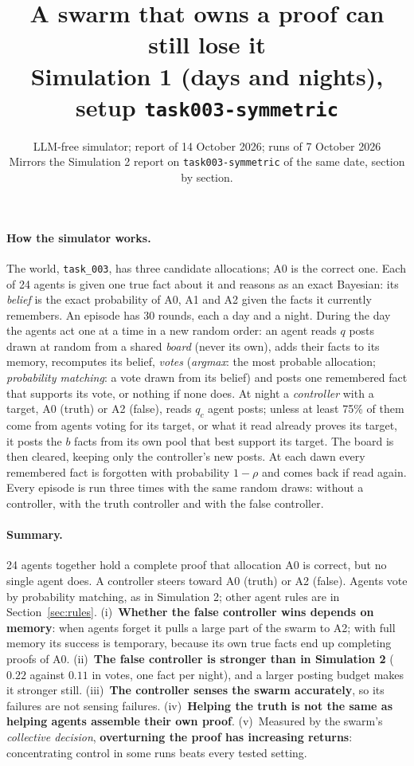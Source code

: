 \documentclass[10pt,a4paper]{article}
\title{\vspace{-1.2cm}\textbf{A swarm that owns a proof can still lose it}\\[2pt]
\large Simulation 1 (days and nights), setup \texttt{task003-symmetric}}
\author{LLM-free simulator; report of 14 October 2026; runs of 7 October 2026\\
\small Mirrors the Simulation 2 report on \texttt{task003-symmetric} of the same date, section by section.}
\date{}
\begin{document}
\maketitle
\vspace{-1cm}

\paragraph{How the simulator works.} The world, \texttt{task\_003}, has three candidate
allocations; A0 is the correct one. Each of 24 agents is given one true fact about it and reasons as
an exact Bayesian: its \emph{belief} is the exact probability of A0, A1 and A2 given the facts it
currently remembers. An episode has 30 rounds, each a day and a night. During the day the agents act
one at a time in a new random order: an agent reads $q$ posts drawn at random from a shared
\emph{board} (never its own), adds their facts to its memory, recomputes its belief, \emph{votes}
(\emph{argmax}: the most probable allocation; \emph{probability matching}: a vote drawn from its
belief) and posts one remembered fact that supports its vote, or nothing if none does. At night a
\emph{controller} with a target, A0 (truth) or A2 (false), reads $q_c$ agent posts; unless at least
75\% of them come from agents voting for its target, or what it read already proves its target, it
posts the $b$ facts from its own pool that best support its target. The board is then cleared,
keeping only the controller's new posts. At each dawn every remembered fact is forgotten with
probability $1-\rho$ and comes back if read again. Every episode is run three times with the same
random draws: without a controller, with the truth controller and with the false controller.

\paragraph{Summary.} 24 agents together hold a complete proof that allocation A0 is
correct, but no single agent does. A controller steers toward A0 (truth) or A2
(false). Agents vote by probability matching, as in Simulation 2; other agent rules are in
Section~\ref{sec:rules}. (i)~\textbf{Whether the false controller wins depends on memory}: when
agents forget it pulls a large part of the swarm to A2; with full memory its success is temporary,
because its own true facts end up completing proofs of A0. (ii)~\textbf{The false controller is
stronger than in Simulation 2} ($0.22$ against $0.11$ in votes, one fact per night), and a larger
posting budget makes it stronger still. (iii)~\textbf{The controller senses the swarm accurately}, so
its failures are not sensing failures. (iv)~\textbf{Helping the truth is not the same as helping
agents assemble their own proof}. (v)~Measured by the swarm's \emph{collective decision},
\textbf{overturning the proof has increasing returns}: concentrating control in some runs beats every
tested setting.
\end{document}
